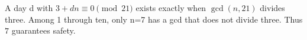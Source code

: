 A day d with $3+dn\equiv0\pmod{21}$ exists exactly when $\gcd(n,21)$ divides three. Among 1 through ten, only n=7 has a gcd that does not divide three. Thus $\boxed7$ guarantees safety.
